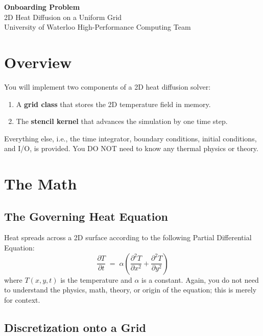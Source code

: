 \documentclass[11pt, a4paper]{article}
\begin{document}
\begin{center}
    {\LARGE\bfseries Onboarding Problem}\\[0.4em]
    {\large 2D Heat Diffusion on a Uniform Grid}\\[0.8em]
    {\small\textcolor{uwmuted}{University of Waterloo High-Performance Computing Team}}\\[0.3em]
\end{center}

\vspace{1.5em}

\section{Overview}

You will implement two components of a 2D heat diffusion solver:
\begin{enumerate}[leftmargin=1.5em, itemsep=0.3em]
    \item A \textbf{grid class} that stores the 2D temperature field in memory.
    \item The \textbf{stencil kernel} that advances the simulation by one time step.
\end{enumerate}
Everything else, i.e., the time integrator, boundary conditions, initial conditions, and I/O, is provided. You DO NOT need to know any thermal physics or theory.

\section{The Math}

\subsection{The Governing Heat Equation}

Heat spreads across a 2D surface according to the following Partial Differential Equation:
\begin{equation}
    \frac{\partial T}{\partial t} \;=\; \alpha \left( \frac{\partial^2 T}{\partial x^2} + \frac{\partial^2 T}{\partial y^2} \right)
\end{equation}
where $T(x,y,t)$ is the temperature and $\alpha$ is a constant. Again, you do not need to understand the physics, math, theory, or origin of the equation; this is merely for context.

\subsection{Discretization onto a Grid}
\end{document}
